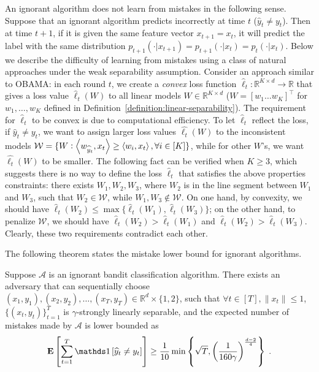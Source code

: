 An ignorant algorithm does not learn from mistakes in the following sense.
Suppose that an ignorant algorithm predicts incorrectly at time $t$ ($\widehat
y_t \neq y_t$). Then at time $t+1$, if it is given the same feature vector
$x_{t+1}=x_t$, it will predict the label with the same distribution
$p_{t+1}(\cdot|x_{t+1})=p_{t+1}(\cdot|x_t)=p_t(\cdot|x_t)$. Below we describe
the difficulty of learning from mistakes using a class of natural approaches
under the weak separability assumption. Consider an approach similar to OBAMA:
in each round $t$, we create a \textit{convex} loss function $\widehat \ell_t:
\mathbb{R}^{K\times d}\rightarrow \mathbb{R}$ that gives a loss value $\widehat
\ell_t(W)$ to all linear models $W\in\mathbb{R}^{K\times d}$ ($W=[w_1 \ldots
w_K]^\top$ for $w_1, \ldots, w_K$ defined in
Definition~\ref{definition:linear-separability}). The requirement for
$\widehat{\ell}_t$ to be convex is due to computational efficiency. To let
$\widehat{\ell}_t$ reflect the loss, if $\widehat y_t \neq y_t$, we want to
assign larger loss values $\widehat{\ell_t}(W)$ to the inconsistent models
$\mathcal{W}=\{W: \left\langle w_{\widehat y_t}, x_t \right\rangle \geq \left\langle w_i, x_t \right\rangle, \forall
i\in[K]\}$, while for other $W$'s, we want $\widehat{\ell_t}(W)$ to be smaller.
The following fact can be verified when $K\geq 3$, which suggests there is no
way to define the loss $\widehat \ell_t$ that satisfies the above properties
constraints: there exists $W_1, W_2, W_3$, where $W_2$ is in the line segment
between $W_1$ and $W_3$, such that $W_2\in \mathcal{W}$, while $W_1, W_3 \notin
\mathcal{W}$. On one hand, by convexity, we should have
$\widehat{\ell}_t(W_2)\leq \max\{\widehat{\ell}_t(W_1),
\widehat{\ell}_t(W_3)\}$; on the other hand, to penalize $\mathcal{W}$, we
should have $\widehat{\ell}_t(W_2) > \widehat{\ell}_t(W_1)$ and
$\widehat{\ell}_t(W_2) > \widehat{\ell}_t(W_3)$. Clearly, these two requirements
contradict each other.

The following theorem states the mistake lower bound for ignorant algorithms.

\begin{theorem}
\label{theorem:ignorant_lower_bound}
Suppose $\mathcal{A}$ is an ignorant bandit classification algorithm. There
exists an adversary that can sequentially choose $(x_1, y_1), (x_2, y_2),
\ldots, (x_T, y_T) \in \mathbb{R}^d\times \{1,2\}$, such that $\forall t\in[T],
\|x_t\|\leq 1$, $\{(x_t, y_t)\}_{t=1}^T$ is $\gamma$-strongly linearly
separable, and the expected number of mistakes made by $\mathcal{A}$ is lower
bounded as
\begin{align*}
\Exp\left[ \sum_{t=1}^T \indicator{\widehat y_t \neq y_t} \right]
\geq \frac{1}{10}\min\left\{\sqrt{T}, \left(\frac{1}{160\gamma}\right)^{\frac{d-2}{4}} \right\} \; .
\end{align*}
\end{theorem}

